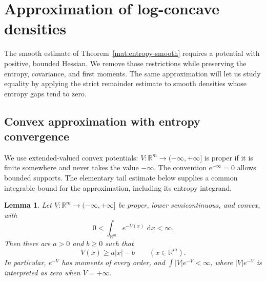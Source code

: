 \documentclass[11pt]{article}
\newcommand{\R}{\mathbb R}
\newcommand{\dd}{\,\mathrm d}
\newtheorem{lemma}[theorem]{Lemma}
\theoremstyle{definition}
\theoremstyle{remark}
\numberwithin{equation}{section}
\begin{document}
\section{Approximation of log-concave densities}\label{geo:section}

The smooth estimate of Theorem~\ref{mat:entropy-smooth} requires a
potential with positive, bounded Hessian. We remove those restrictions
while preserving the entropy, covariance, and first moments. The same
approximation will let us study equality by applying the strict
remainder estimate to smooth densities whose entropy gaps tend to zero.

\subsection{Convex approximation with entropy convergence}

We use extended-valued convex potentials: $V:\R^m\to(-\infty,+\infty]$ is
proper if it is finite somewhere and never takes the value $-\infty$.
The convention $e^{-\infty}=0$ allows bounded supports.
The elementary tail estimate below supplies a common integrable bound for
the approximation, including its entropy integrand.

\begin{lemma}\label{geo:coercivity}
Let $V:\R^m\to(-\infty,+\infty]$ be proper, lower semicontinuous, and convex,
with
\[
  0<\int_{\R^m}e^{-V(x)}\,\dd x<\infty.
\]
Then there are $a>0$ and $b\geq0$ such that
\begin{equation}\label{geo:linear-coercivity}
  V(x)\geq a|x|-b\qquad(x\in\R^m).
\end{equation}
In particular, $e^{-V}$ has moments of every order, and
$\int |V|e^{-V}<\infty$, where $|V|e^{-V}$ is interpreted as zero when
$V=+\infty$.
\end{lemma}
\end{document}
